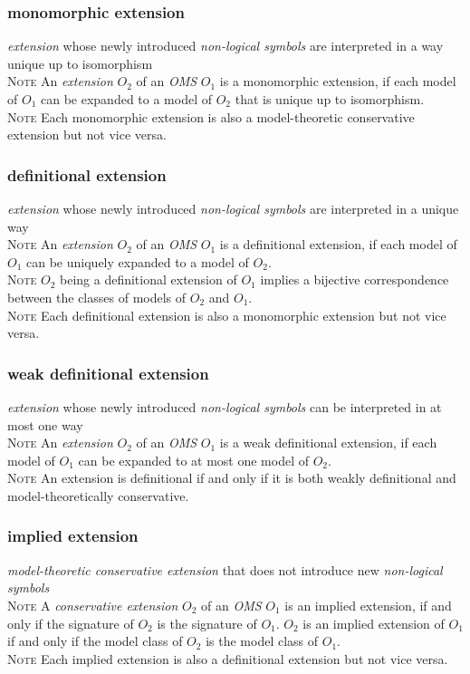 \documentclass[10pt,%
\ifpretendfinal
final%
\else
draft%
\fi,
]{scrreprt}
\newcommand*{\termref}[1]{\textit{#1}}
\newcommand{\termdefinition}[2]{\subsubsection*{\normalsize #1}#2}
\newenvironment{definitions}[0]{\medskip }{}
\newenvironment{note}[0]{\ \\ \textsc{Note} \quad}{}
\begin{document}
\begin{definitions}
  \termdefinition{monomorphic extension}{\termref{extension} whose newly introduced
   \termref{non-logical symbols} are interpreted in a way unique up to isomorphism}
  \begin{note}
An \termref{extension} $O_2$ of an \termref{OMS} $O_1$ is a monomorphic extension, if each model of $O_1$ can be expanded to a model of $O_2$ that is unique up to isomorphism.
  \end{note}
  \begin{note}
    Each monomorphic extension is also a model-theoretic conservative extension but not vice versa.
  \end{note}

  \termdefinition{definitional extension}{\termref{extension} whose newly introduced
   \termref{non-logical symbols} are interpreted in a unique way}
  \begin{note}
An \termref{extension} $O_2$ of an \termref{OMS} $O_1$ is a definitional extension, if each model of $O_1$ can be uniquely expanded to a model of $O_2$.
  \end{note}
  \begin{note}
    $O_2$ being a definitional extension of $O_1$ implies a bijective correspondence between the classes of models of $O_2$ and $O_1$.
  \end{note}
  \begin{note}
    Each definitional extension is also a monomorphic extension but not vice versa.
  \end{note}

  \termdefinition{weak definitional extension}{\termref{extension} whose newly introduced
   \termref{non-logical symbols} can be interpreted in at most one way}
  \begin{note}
An \termref{extension} $O_2$ of an \termref{OMS} $O_1$ is a weak definitional extension, if each model of $O_1$ can be expanded to at most one model of $O_2$.
  \end{note}
  \begin{note}
    An extension is definitional if and only if it is both weakly definitional
   and model-theoretically conservative.
  \end{note}

  \termdefinition{implied extension}{\termref{model-theoretic conservative extension} that does not introduce new \termref{non-logical symbols}}
  \begin{note}
    A \termref{conservative extension} $O_2$ of an \termref{OMS}
    $O_1$ is an implied extension, if and only if the signature of
    $O_2$ is the signature of $O_1$.  $O_2$ is an implied extension of
    $O_1$ if and only if the model class of $O_2$ is the model class
    of $O_1$.
  \end{note}
  \begin{note}
    Each implied extension is also a definitional extension but not vice versa.
  \end{note}


\end{definitions}
\end{document}
